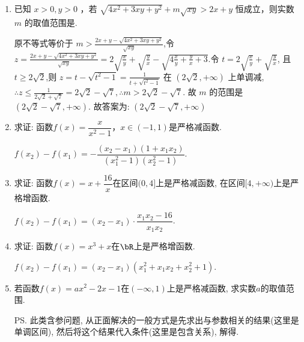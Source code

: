 \begin{enumerate}
\item 已知 $x>0, y>0$ ，若 $\sqrt{4 x^{2}+3 x y+y^{2}}+m \sqrt{x y}>2 x+y$ 恒成立，则实数 $m$ 的取值范围是.
\begin{jieda}
原不等式等价于 $m>\frac{2 x+y-\sqrt{4 x^{2}+3 x y+y^{2}}}{\sqrt{x y}}$,令 $z=\frac{2 x+y-\sqrt{4 x^{2}+3 x y+y^{2}}}{\sqrt{x y}}=2 \sqrt{\frac{x}{y}}+\sqrt{\frac{y}{x}}-\sqrt{4 \frac{x}{y}+\frac{y}{x}+3}$.令 $t=2 \sqrt{\frac{x}{y}}+\sqrt{\frac{y}{x}}$, 且 $t \geq 2 \sqrt{2}$,则 $z=t-\sqrt{t^{2}-1}=\frac{1}{t+\sqrt{t^{2}-1}}$ 在 $(2 \sqrt{2},+\infty)$ 上单调减, $\therefore z \leq \frac{1}{2 \sqrt{2}+\sqrt{7}}=2 \sqrt{2}-\sqrt{7}, \therefore m>2 \sqrt{2}-\sqrt{7}$.
故 $m$ 的范围是 $(2 \sqrt{2}-\sqrt{7},+\infty)$.
故答案为: $(2 \sqrt{2}-\sqrt{7},+\infty)$
\end{jieda}

\item 求证: 函数$f(x)=\dfrac{x}{x^2-1}$，$x\in(-1,1)$是严格减函数. 
\begin{jieda}
$f(x_2)-f(x_1)=-\dfrac{(x_2-x_1)(1+x_1x_2)}{(x_1^2-1)(x_2^2-1)}$. 
\end{jieda}
\begin{vspace_}
   \vsp[2] 
\end{vspace_}

\item 求证: 函数$f(x)=x+\dfrac{16}{x}$在区间$(0,4]$上是严格减函数, 在区间$[4,+\infty)$上是严格增函数. 
\begin{jieda}
$f(x_2)-f(x_1)=(x_2-x_1)\cdot\dfrac{x_1x_2-16}{x_1x_2}$. 
\end{jieda}
\begin{vspace_}
   \vsp[2] 
\end{vspace_}


\item 求证: 函数$f(x)=x^3+x$在$\bR$上是严格增函数. 
\begin{jieda}
$f(x_2)-f(x_1)=(x_2-x_1)(x_1^2+x_1x_2+x_2^2+1)$. 
\end{jieda}
\begin{vspace_}
   \vsp[2] 
\end{vspace_}


\item 若函数$f(x)=ax^2-2x-1$在$(-\infty,1)$上是严格减函数, 求实数$a$的取值范围. %
\begin{jieda}
\ps 此类含参问题, 从正面解决的一般方式是先求出与参数相关的结果(这里是单调区间), 然后将这个结果代入条件(这里是包含关系), 解得. 
\end{jieda}
\begin{vspace_}
   \vsp[2] 
\end{vspace_}


\end{enumerate}
